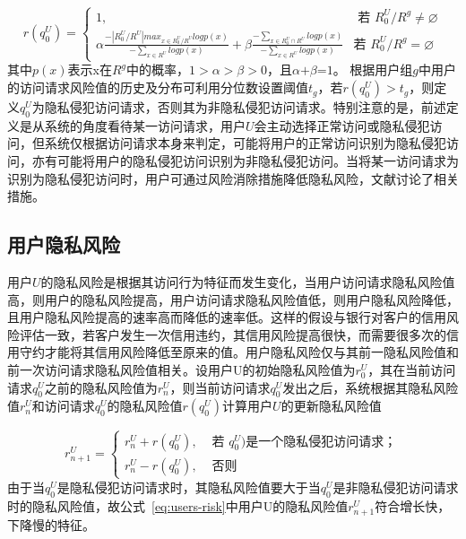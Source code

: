 \begin{equation}
r(q_{0}^{U})=\begin{cases}
1, & \text{ 若 } R_{0}^{U}/{{R}^{g}}\ne \varnothing \\ 
\alpha \frac{-|R_{0}^{U}/{R}^{U}|max_{x\in R_{0}^{U}/{R}^{U}}logp(x)}{-\sum_{x\in{R^U}}logp(x)}+ \beta \frac{-\sum_{x\in R_0^U \cap  R^U}logp(x)}{-\sum_{x\in  R^U}logp(x)}& \text{若 } R_{0}^{U}/{{R}^{g}}=\varnothing 
\end{cases}
\end{equation}
其中$p(x)$表示x在$R_{{}}^{g}$中的概率，$1>\alpha >\beta >0$，且$\alpha \text{+}\beta \text{=}1$。
根据用户组$g$中用户的访问请求风险值的历史及分布可利用分位数设置阈值${{t}_{g}}$，若$r(q_{0}^{U})>{{t}_{g}}$，则定义$q_{0}^{U}$为隐私侵犯访问请求，否则其为非隐私侵犯访问请求。特别注意的是，前述定义是从系统的角度看待某一访问请求，用户$U$会主动选择正常访问或隐私侵犯访问，但系统仅根据访问请求本身来判定，可能将用户的正常访问识别为隐私侵犯访问，亦有可能将用户的隐私侵犯访问识别为非隐私侵犯访问。当将某一访问请求为识别为隐私侵犯访问时，用户可通过风险消除措施降低隐私风险，文献\cite{diaz-lopez2016dynamic}讨论了相关措施。

\subsection{用户隐私风险}
用户$U$的隐私风险是根据其访问行为特征而发生变化，当用户访问请求隐私风险值高，则用户的隐私风险提高，用户访问请求隐私风险值低，则用户隐私风险降低，且用户隐私风险提高的速率高而降低的速率低。这样的假设与银行对客户的信用风险评估一致，若客户发生一次信用违约，其信用风险提高很快，而需要很多次的信用守约才能将其信用风险降低至原来的值。用户隐私风险仅与其前一隐私风险值和前一次访问请求隐私风险值相关。设用户U的初始隐私风险值为$r_{0}^{U}$，其在当前访问请求$q_{0}^{U}$之前的隐私风险值为$r_{n}^{U}$，则当前访问请求$q_{0}^{U}$发出之后，系统根据其隐私风险值$r_{n}^{U}$和访问请求$q_{0}^{U}$的隐私风险值$r(q_{0}^{U})$计算用户$U$的更新隐私风险值

\begin{equation}\label{eq:users-risk}
r_{n+1}^{U}=\begin{cases}
r_{n}^{U}+r(q_0^U), & \text{ 若 } q_0^U) \text{是一个隐私侵犯访问请求}； \\ 
r_{n}^{U}-r(q_0^U),& \text{ 否则}
\end{cases}
\end{equation} 
由于当$q_{0}^{U}$是隐私侵犯访问请求时，其隐私风险值要大于当$q_{0}^{U}$是非隐私侵犯访问请求时的隐私风险值，故公式~\ref{eq:users-risk}中用户U的隐私风险值$r_{n+1}^{U}$符合增长快，下降慢的特征。

